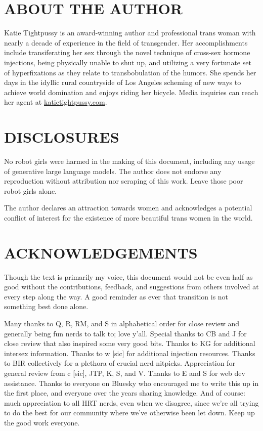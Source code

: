 \documentclass{article}
\begin{document}
\section*{ABOUT THE AUTHOR}

Katie Tightpussy is an award-winning author and professional trans woman with nearly a decade of experience in the field of transgender. Her accomplishments include transiferating her sex through the novel technique of cross-sex hormone injections, being physically unable to shut up, and utilizing a very fortunate set of hyperfixations as they relate to transbobulation of the humors. She spends her days in the idyllic rural countryside of Los Angeles scheming of new ways to achieve world domination and enjoys riding her bicycle. Media inquiries can reach her agent at \href{http://katietightpussy.com}{katietightpussy.com}.



\section*{DISCLOSURES}

No robot girls were harmed in the making of this document, including any usage of generative large language models. The author does not endorse any reproduction without attribution nor scraping of this work. Leave those poor robot girls alone.

The author declares an attraction towards women and acknowledges a potential conflict of interest for the existence of more beautiful trans women in the world.



\section*{ACKNOWLEDGEMENTS}

Though the text is primarily my voice, this document would not be even half as good without the contributions, feedback, and suggestions from others involved at every step along the way. A good reminder as ever that transition is not something best done alone.

Many thanks to Q, R, RM, and S in alphabetical order for close review and generally being fun nerds to talk to; love y’all. Special thanks to CB and J for close review that also inspired some very good bits. Thanks to KG for additional intersex information. Thanks to w [sic] for additional injection resources. Thanks to BIR collectively for a plethora of crucial nerd nitpicks. Appreciation for general review from c [sic], JTP, K, S, and V. Thanks to E and S for web dev assistance. Thanks to everyone on Bluesky who encouraged me to write this up in the first place, and everyone over the years sharing knowledge. And of course: much appreciation to all HRT nerds, even when we disagree, since we’re all trying to do the best for our community where we’ve otherwise been let down. Keep up the good work everyone.
\end{document}
